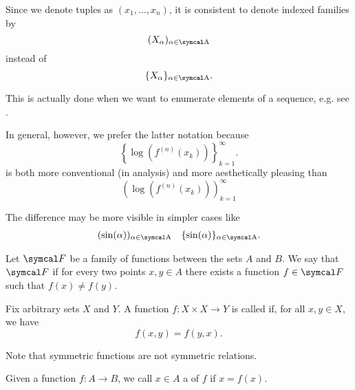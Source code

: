 \begin{remark}\label{remark:indexed_family_notation}
  Since we denote tuples as \( (x_1, \ldots, x_n) \), it is consistent to denote indexed families by
  \begin{equation*}
    ( X_\al )_{\al \in \CA}
  \end{equation*}
  instead of
  \begin{equation*}
    \{ X_\al \}_{\al \in \CA}.
  \end{equation*}

  This is actually done when we want to enumerate elements of a sequence, e.g. see .

  In general, however, we prefer the latter notation because
  \begin{equation*}
    \left\{ \log \left( f^{(n)}(x_k) \right) \right\}_{k=1}^\infty.
  \end{equation*}
  is both more conventional (in analysis) and more aesthetically pleasing than
  \begin{equation*}
    \left( \log \left( f^{(n)}(x_k) \right) \right)_{k=1}^\infty
  \end{equation*}

  The difference may be more visible in simpler cases like
  \begin{align*}
    (\sin(\al))_{\al \in \CA}
    &&
    \{\sin(\al)\}_{\al \in \CA}.
  \end{align*}
\end{remark}

\begin{definition}\label{def:family_of_functions_separates_points}
  Let \( \Cal{F} \) be a family of functions between the sets \( A \) and \( B \). We say that \( \Cal{F} \)  if for every two points \( x, y \in A \) there exists a function \( f \in \Cal{F} \) such that \( f(x) \neq f(y) \).
\end{definition}

\begin{definition}\label{def:symmetric_function}
  Fix arbitrary sets \( X \) and \( Y \). A function \( f: X \times X \to Y \) is called  if, for all \( x, y \in X \), we have
  \begin{equation*}
    f(x, y) = f(y, x).
  \end{equation*}

  Note that symmetric functions are not symmetric relations.
\end{definition}

\begin{definition}\label{def:fixed_point}
  Given a function \( f: A \to B \), we call \( x \in A \) a  of \( f \) if \( x = f(x) \).
\end{definition}
